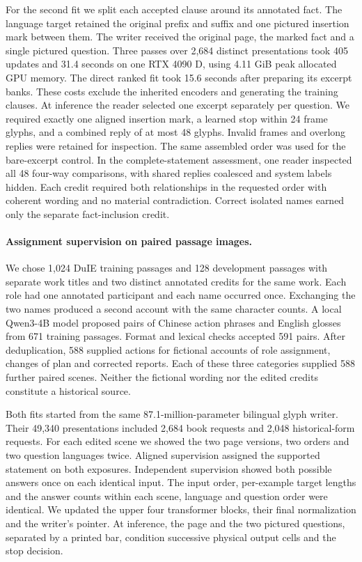 \documentclass[12pt,a4paper]{article}
\providecommand{\DIFadd}[1]{{\protect\color{blue} \sf #1}} %
\begin{document}
\DIFadd{For the second fit we split each accepted clause around its annotated fact. The language target retained the original prefix and suffix and one pictured insertion mark between them. The writer received the original page, the marked fact and a single pictured question. Three passes over 2,684 distinct presentations took 405 updates and 31.4 seconds on one RTX 4090 D, using 4.11 GiB peak allocated GPU memory. The direct ranked fit took 15.6 seconds after preparing its excerpt banks. These costs exclude the inherited encoders and generating the training clauses. At inference the reader selected one excerpt separately per question. We required exactly one aligned insertion mark, a learned stop within 24 frame glyphs, and a combined reply of at most 48 glyphs. Invalid frames and overlong replies were retained for inspection. The same assembled order was used for the bare-excerpt control. In the complete-statement assessment, one reader inspected all 48 four-way comparisons, with shared replies coalesced and system labels hidden. Each credit required both relationships in the requested order with coherent wording and no material contradiction. Correct isolated names earned only the separate fact-inclusion credit.
}

\paragraph{\DIFadd{Assignment supervision on paired passage images.}}
\DIFadd{We chose 1,024 DuIE training passages and 128 development passages with separate work titles and two distinct annotated credits for the same work. Each role had one annotated participant and each name occurred once. Exchanging the two names produced a second account with the same character counts. A local Qwen3-4B model proposed pairs of Chinese action phrases and English glosses from 671 training passages. Format and lexical checks accepted 591 pairs. After deduplication, 588 supplied actions for fictional accounts of role assignment, changes of plan and corrected reports. Each of these three categories supplied 588 further paired scenes. Neither the fictional wording nor the edited credits constitute a historical source.
}

\DIFadd{Both fits started from the same 87.1-million-parameter bilingual glyph writer. Their 49,340 presentations included 2,684 book requests and 2,048 historical-form requests. For each edited scene we showed the two page versions, two orders and two question languages twice. Aligned supervision assigned the supported statement on both exposures. Independent supervision showed both possible answers once on each identical input. The input order, per-example target lengths and the answer counts within each scene, language and question order were identical. We updated the upper four transformer blocks, their final normalization and the writer's pointer. At inference, the page and the two pictured questions, separated by a printed bar, condition successive physical output cells and the stop decision.
}
\end{document}
